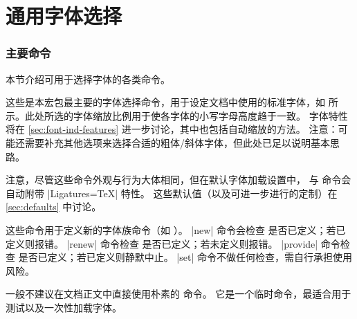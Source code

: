 \documentclass[a4paper]{l3doc}
\begin{document}
\part{通用字体选择}

\section{主要命令}
\label{sec:main-cmd}

本节介绍可用于选择字体的各类命令。

\bigskip
{}

这些是本宏包最主要的字体选择命令，用于设定文档中使用的标准字体，如 
所示。此处所选的字体缩放比例用于使各字体的小写字母高度趋于一致。
字体特性将在 \vref{sec:font-ind-features} 进一步讨论，其中也包括自动缩放的方法。
注意：可能还需要补充其他选项来选择合适的粗体/斜体字体，但此处已足以说明基本思路。

注意，尽管这些命令外观与行为大体相同，但在默认字体加载设置中，
 与  命令会自动附带 |Ligatures=TeX| 特性。
这些默认值（以及可进一步进行的定制）在 \vref{sec:defaults} 中讨论。

\bigskip
{}

这些命令用于定义新的字体族命令（如 ）。
|new| 命令会检查  是否已定义；若已定义则报错。
|renew| 命令检查  是否已定义；若未定义则报错。
|provide| 命令检查  是否已定义；若已定义则静默中止。
|set| 命令不做任何检查，需自行承担使用风险。


\bigskip
{}

一般不建议在文档正文中直接使用朴素的  命令。
它是一个临时命令，最适合用于测试以及一次性加载字体。
\end{document}
